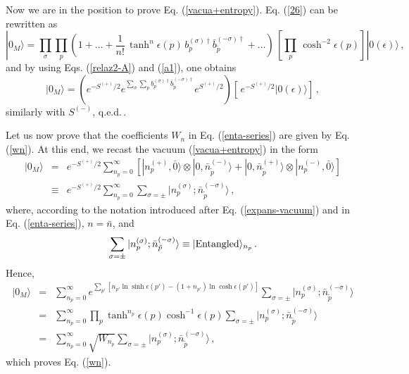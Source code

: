 Now we are in the position to prove Eq. (\ref{vacua+entropy}). Eq.
(\ref{26}) can be rewritten as
\begin{equation}\label{vac1A}
  |0_M\rangle = \prod_\sigma\prod_p \left( 1+\ldots +
  \frac{1}{n!}\,\tanh^n\epsilon(p)\,
  b_p^{(\sigma)\dagger} \bar{b}_{\tilde
 p}^{(-\sigma)\dagger}+\ldots \right)\,
 \left[\prod_p\,\cosh^{-2} \epsilon(p)\right] |0(\epsilon)\rangle\,{,}
\end{equation}
and by using Eqs. (\ref{relaz2-A}) and (\ref{a1}), one obtains
\begin{equation}\label{vacfin}
 |0_M\rangle = \left(e^{-S^{(+)}/2}e^{\sum_\sigma\sum_p b_p^{(\sigma)\dagger} \bar{b}_{\tilde
 p}^{(-\sigma)\dagger}}e^{S^{(+)}/2}\right)\left[\,e^{-S^{(+)}/2}|0(\epsilon)\rangle \right]
 \,,
\end{equation}
similarly with $S^{(-)}$, q.e.d.\,.

\noindent Let us now prove that the coefficients $W_n$ in Eq.
(\ref{enta-series}) are given by Eq. (\ref{wn}). At this end, we
recast the vacuum (\ref{vacua+entropy}) in the form
\begin{eqnarray}\label{vac2A}
  |0_M\rangle &=&e^{-S^{(+)}/2}\sum_{n_p=0}^\infty \left[
  |n_p^{(+)}, {\bar 0}\rangle \otimes |0, {\bar n}_{\tilde
  p}^{(-)}\rangle + |0, {\bar n}_{\tilde
  p}^{(+)}\rangle \otimes |n_p^{(-)}, {\bar 0}\rangle\right] \\
   &\equiv & e^{-S^{(+)}/2} \sum_{n_p=0}^\infty \sum_{\sigma=\pm} |n_p^{(\sigma)};{\bar n}_{\tilde
   p}^{(-\sigma)}\rangle \nonumber \,,
\end{eqnarray}
where, according to the notation introduced after Eq.
(\ref{expans-vacuum}) and in Eq. (\ref{enta-series}), $n={\bar
n}$, and
 \[
 \sum_{\sigma=\pm} |n_p^{(\sigma)}; {\bar n}_{\tilde
   p}^{(-\sigma)}\rangle \equiv |{\rm Entangled}\rangle_{n_p}\,.
 \]
Hence,
\begin{eqnarray}\label{vac3A}
 |0_M\rangle &=& \sum_{n_p=0}^\infty e^{\sum_{p'}[n_{p'}\ln \sinh\epsilon(p')-
 (1+n_{p'})\ln\cosh\epsilon(p')]}
 \sum_{\sigma=\pm} |n_p^{(\sigma)}; {\bar n}_{\tilde
   p}^{(-\sigma)}\rangle  \\
  &=& \sum_{n_p=0}^\infty\prod_p
  \tanh^{n_p}\epsilon(p)\cosh^{-1}\epsilon(p)\sum_{\sigma=\pm} |n_p^{(\sigma)}; {\bar n}_{\tilde
   p}^{(-\sigma)}\rangle \nonumber \\
   &=& \sum_{n_p=0}^\infty \sqrt{W_{n_p}}\sum_{\sigma=\pm} |n_p^{(\sigma)}; {\bar n}_{\tilde
   p}^{(-\sigma)}\rangle\,, \nonumber
\end{eqnarray}
which proves Eq. (\ref{wn}).



